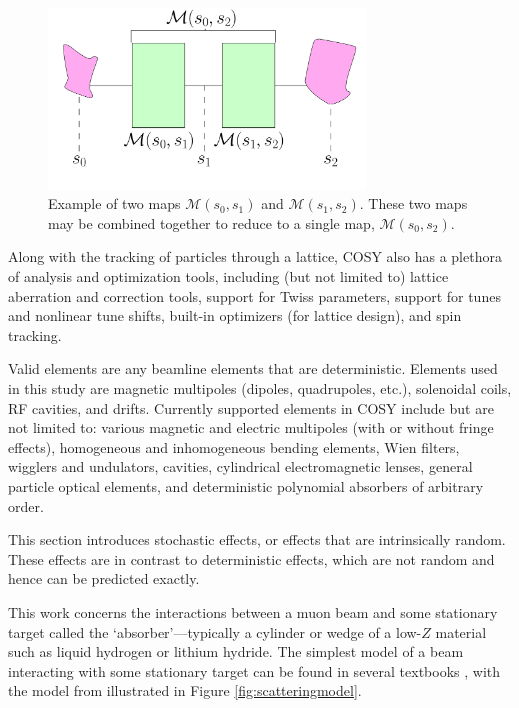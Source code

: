 \begin{figure}[h!]
  \centering
    \includegraphics[width=0.75\textwidth]{Figures/matrix_element_example_2} 
  \caption{Example of two maps $\mathcal{M}(s_0,s_1)$ and $\mathcal{M}(s_1,s_2)$. These two maps may be combined together to reduce to a single map, $\mathcal{M}(s_0,s_2)$.}
  \label{fig:matrix_element_example_2}
\end{figure}

Along with the tracking of particles through a lattice, COSY also has a plethora of analysis and optimization tools, including (but not limited to) lattice aberration and correction tools, support for Twiss parameters, support for tunes and nonlinear tune shifts, built-in optimizers (for lattice design), and spin tracking.

Valid elements are any beamline elements that are deterministic. Elements used in this study are magnetic multipoles (dipoles, quadrupoles, etc.), solenoidal coils, RF cavities, and drifts. Currently supported elements in COSY include but are not limited to: various magnetic and electric multipoles (with or without fringe effects), homogeneous and inhomogeneous bending elements, Wien filters, wigglers and undulators, cavities, cylindrical electromagnetic lenses, general particle optical elements, and deterministic polynomial absorbers of arbitrary order.

\par

This section introduces stochastic effects, or effects that are intrinsically random. These effects are in contrast to deterministic effects, which are not random and hence can be predicted exactly. 

This work concerns the interactions between a muon beam and some stationary target called the `absorber'---typically a cylinder or wedge of a low-$Z$ material such as liquid hydrogen or lithium hydride. The simplest model of a beam interacting with some stationary target can be found in several textbooks \cite{nielsen,griffithsqm}, with the model from \cite{jose} illustrated in Figure \ref{fig:scatteringmodel}.

